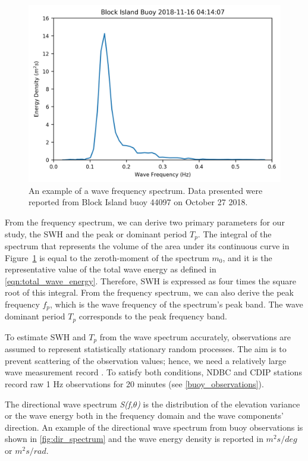  
\begin{figure}[H]
\centering
\includegraphics[width=0.85\linewidth]{Figures/Chapter2/freq_spectrum.png}
\caption{An example of a wave frequency spectrum. Data presented were reported from Block Island buoy 44097 on October 27 2018.}
\label{fig:freq_spectrum}
\end{figure}


From the frequency spectrum, we can derive two primary parameters for our study, the SWH and the peak or dominant period $T_{p}$. The integral of the spectrum that represents the volume of the area under its continuous curve in Figure~\ref{fig:freq_spectrum} is equal to the zeroth-moment of the spectrum $m_{0}$, and it is the representative value of the total wave energy as defined in \ref{eqn:total_wave_energy}. Therefore, SWH is expressed as four times the square root of this integral. From the frequency spectrum, we can also derive the peak frequency $f_{p}$, which is the wave frequency of the spectrum's peak band. The wave dominant period $T_{p}$ corresponds to the peak frequency band.


To estimate SWH and $T_{p}$ from the wave spectrum accurately, observations are assumed to represent statistically stationary random processes. The aim is to prevent scattering of the observation values; hence, we need a relatively large wave measurement record \cite{Organization1998a}. To satisfy both conditions, NDBC and CDIP stations record raw 1 Hz observations for 20 minutes (see \ref{buoy_observations}).


The directional wave spectrum \emph{S(f,$\theta$)} is the distribution of the elevation variance or the wave energy both in the frequency domain and the wave components' direction. An example of the directional wave spectrum from buoy observations is shown in \ref{fig:dir_spectrum} and the wave energy density is reported in $m^{2}s/deg$ or $m^{2}s/rad$.


